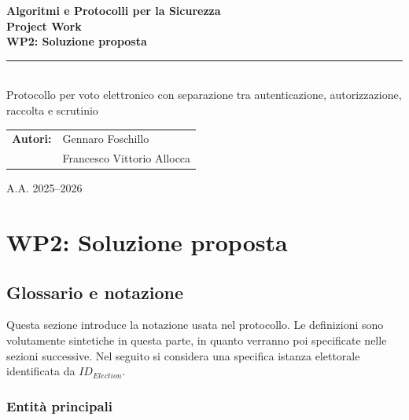 \documentclass[a4paper,12pt]{article}
\begin{document}
\hypersetup{pageanchor=false}
\begin{titlepage}
	\centering
	\vspace*{1.7cm}
	{\Large\color{MainBlue}\textbf{Algoritmi e Protocolli per la Sicurezza}\\[0.4cm]}
	{\Huge\bfseries Project Work\\[0.25cm]}
	{\LARGE\bfseries WP2: Soluzione proposta\\[0.6cm]}
	\textcolor{MainBlue}{\rule{0.82\textwidth}{1.2pt}}\\[1.0cm]
	{\large Protocollo per voto elettronico con separazione tra autenticazione, autorizzazione, raccolta e scrutinio}\\[2.2cm]
	\begin{tabular}{rl}
		\textbf{Autori:} & Gennaro Foschillo \\
		                 & Francesco Vittorio Allocca \\
	\end{tabular}
	\vfill
	{\large A.A. 2025--2026}
\end{titlepage}

\hypersetup{pageanchor=true}
\tableofcontents
\newpage
{}

\section{WP2: Soluzione proposta}

\subsection{Glossario e notazione}

Questa sezione introduce la notazione usata nel protocollo. Le definizioni sono volutamente sintetiche in questa parte, in quanto verranno poi specificate nelle sezioni successive. Nel seguito si considera una specifica istanza elettorale identificata da
$ID_{Election}$.

\subsubsection{Entità principali}
\end{document}
